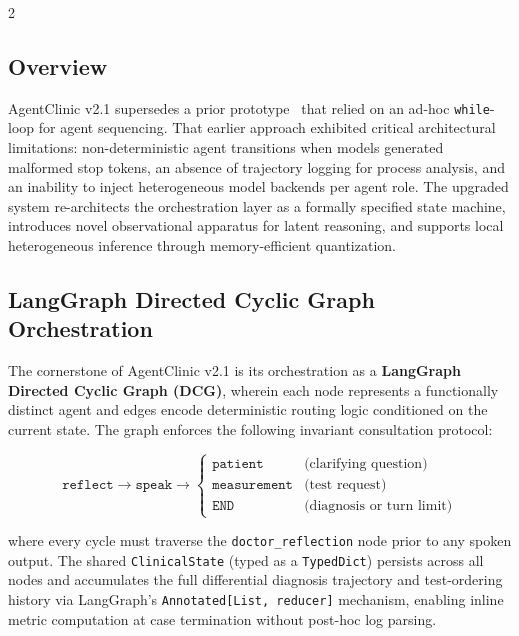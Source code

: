 \documentclass[10pt, a4paper]{article}
\begin{document}
\begin{multicols}{2}
\subsection{Overview}

AgentClinic v2.1 supersedes a prior prototype~\cite{schmidgall2024agentclinic_impl} that relied on an ad-hoc \texttt{while}-loop for agent sequencing. That earlier approach exhibited critical architectural limitations: non-deterministic agent transitions when models generated malformed stop tokens, an absence of trajectory logging for process analysis, and an inability to inject heterogeneous model backends per agent role. The upgraded system re-architects the orchestration layer as a formally specified state machine, introduces novel observational apparatus for latent reasoning, and supports local heterogeneous inference through memory-efficient quantization.

\subsection{LangGraph Directed Cyclic Graph Orchestration}
\label{ssec:dcg}

The cornerstone of AgentClinic v2.1 is its orchestration as a \textbf{LangGraph Directed Cyclic Graph (DCG)}, wherein each node represents a functionally distinct agent and edges encode deterministic routing logic conditioned on the current state. The graph enforces the following invariant consultation protocol:

\begin{equation}
    \texttt{reflect} \to \texttt{speak} \to \begin{cases}
        \texttt{patient} & \text{(clarifying question)} \\
        \texttt{measurement} & \text{(test request)} \\
        \texttt{END} & \text{(diagnosis or turn limit)}
    \end{cases}
    \label{eq:dcg}
\end{equation}

where every cycle must traverse the \texttt{doctor\_reflection} node prior to any spoken output. The shared \texttt{ClinicalState} (typed as a \texttt{TypedDict}) persists across all nodes and accumulates the full differential diagnosis trajectory and test-ordering history via LangGraph's \texttt{Annotated[List, reducer]} mechanism, enabling inline metric computation at case termination without post-hoc log parsing.


\end{multicols}
\end{document}
